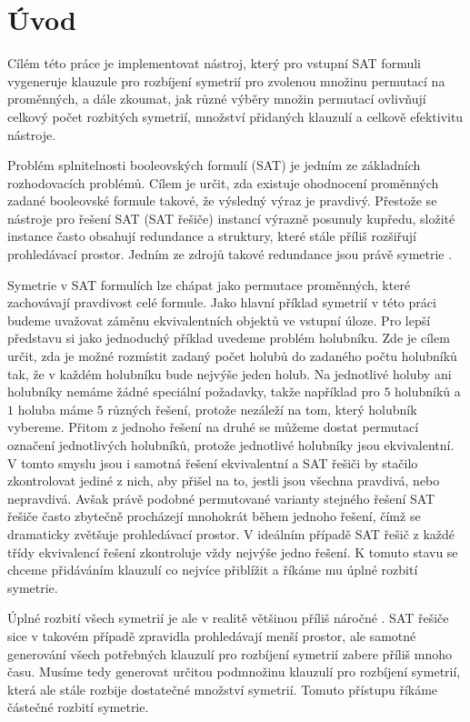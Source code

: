 \chapter*{Úvod}

Cílém této práce je implementovat nástroj, který pro vstupní SAT formuli vygeneruje klauzule pro rozbíjení symetrií pro zvolenou množinu permutací na proměnných, a dále zkoumat, jak různé výběry množin permutací ovlivňují celkový počet rozbitých symetrií, množství přidaných klauzulí a celkově efektivitu nástroje.

Problém splnitelnosti booleovských formulí (SAT) je jedním ze základních rozhodovacích problémů. Cílem je určit, zda existuje ohodnocení proměnných zadané booleovské formule takové, že výsledný výraz je pravdivý. Přestože se nástroje pro řešení SAT (SAT řešiče) instancí výrazně posunuly kupředu, složité instance často obsahují redundance a struktury, které stále příliš rozšiřují prohledávací prostor. Jedním ze zdrojů takové redundance jsou právě symetrie  \cite{DBLP:reference/fai/GentPP06}\cite{article}.

Symetrie v SAT formulích lze chápat jako permutace proměnných, které zachovávají pravdivost celé formule. Jako hlavní příklad symetrií v této práci budeme uvažovat záměnu ekvivalentních objektů ve vstupní úloze. Pro lepší představu si jako jednoduchý příklad uvedeme problém holubníku. Zde je cílem určit, zda je možné rozmístit zadaný počet holubů do zadaného počtu holubníků tak, že v každém holubníku bude nejvýše jeden holub. Na jednotlivé holuby ani holubníky nemáme žádné speciální požadavky, takže například pro $5$ holubníků a $1$ holuba máme $5$ různých řešení, protože nezáleží na tom, který holubník vybereme. Přitom z jednoho řešení na druhé se můžeme dostat permutací označení jednotlivých holubníků, protože jednotlivé holubníky jsou ekvivalentní. V tomto smyslu jsou i samotná řešení ekvivalentní a SAT řešiči by stačilo zkontrolovat jediné z nich, aby přišel na to, jestli jsou všechna pravdivá, nebo nepravdivá. Avšak právě podobné permutované varianty stejného řešení SAT řešiče často zbytečně procházejí mnohokrát během jednoho řešení, čímž se dramaticky zvětšuje prohledávací prostor. V ideálním případě SAT řešič z každé třídy ekvivalencí řešení zkontroluje vždy nejvýše jedno řešení. K tomuto stavu se chceme přidáváním klauzulí co nejvíce přiblížit a říkáme mu úplné rozbití symetrie.

Úplné rozbití všech symetrií je ale v realitě většinou příliš náročné \cite{DBLP:reference/fai/GentPP06}. SAT řešiče sice v takovém případě zpravidla prohledávají menší prostor, ale samotné generování všech potřebných klauzulí pro rozbíjení symetrií zabere příliš mnoho času. Musíme tedy generovat určitou podmnožinu klauzulí pro rozbíjení symetrií, která ale stále rozbije dostatečné množství symetrií. Tomuto přístupu říkáme částečné rozbití symetrie. \nocite{*}

